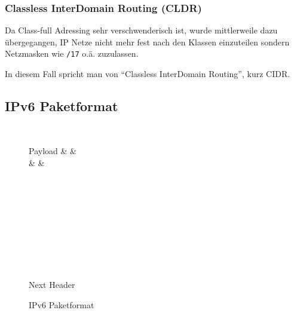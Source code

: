 	\subsubsection{Classless InterDomain Routing (CLDR)}
		Da Class-full Adressing sehr verschwenderisch ist, wurde mittlerweile dazu übergegangen, IP Netze nicht mehr fest nach den Klassen einzuteilen sondern Netzmasken wie \texttt{/17} o.ä. zuzulassen.

		In diesem Fall spricht man von \enquote{Classless InterDomain Routing}, kurz CIDR.

		\subsection{IPv6 Paketformat}
			\begin{figure}[H]
				\centering
				\begin{bytefield}[bitwidth = 1.2em]{32}
					 \\
					\begin{rightwordgroup}{Payload}
						 &  &  \\
						 &  &  \\
						 \\
						 \\
						 \\
						 \\
						 \\
						 \\
						 \\
					\end{rightwordgroup} \\
					\begin{rightwordgroup}{Next Header}
						\bitbox{32}{}
					\end{rightwordgroup}
				\end{bytefield}
				\caption{IPv6 Paketformat}
				\label{fig:ipv6packet}
			\end{figure}

